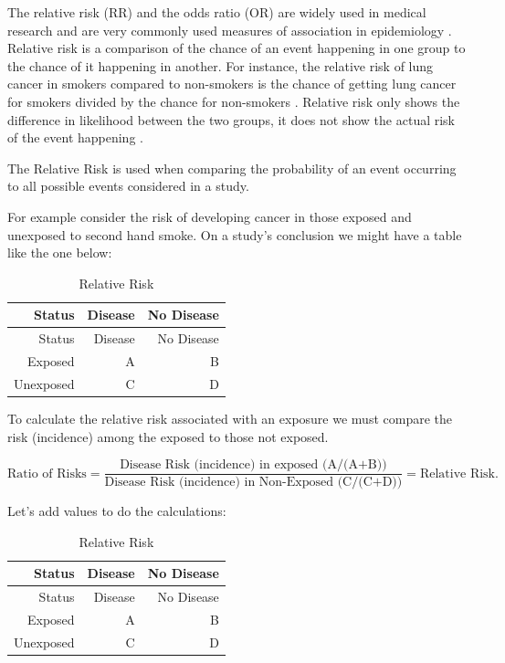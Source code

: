 \documentclass[
]{book}
\begin{document}
The relative risk (RR) and the odds ratio (OR) are widely used in medical research and are very commonly used measures of association in epidemiology \citep{schmidtty}. Relative risk is a comparison of the chance of an event happening in one group to the chance of it happening in another. For instance, the relative risk of lung cancer in smokers compared to non-smokers is the chance of getting lung cancer for smokers divided by the chance for non-smokers \citep{tenny}. Relative risk only shows the difference in likelihood between the two groups, it does not show the actual risk of the event happening \citep{tenny}.

The Relative Risk is used when comparing the probability of an event occurring to all possible events considered in a study.

For example consider the risk of developing cancer in those exposed and unexposed to second hand smoke. On a study's conclusion we might have a table like the one below:

\begin{longtable}[]{@{}rrr@{}}
\caption{\label{tab:table14} Relative Risk}\tabularnewline
\toprule
Status & Disease & No Disease \\
\midrule
\endfirsthead
\toprule
Status & Disease & No Disease \\
\midrule
\endhead
Exposed & A & B \\
Unexposed & C & D \\
\bottomrule
\end{longtable}

To calculate the relative risk associated with an exposure we must compare the risk (incidence) among the exposed to those not exposed.

\[\textrm{Ratio of Risks} = \frac{\textrm{Disease Risk (incidence) in exposed (A/(A+B))}}{ \textrm{Disease Risk (incidence) in Non-Exposed (C/(C+D))}} = \textrm{Relative Risk}. \]

Let's add values to do the calculations:

\begin{longtable}[]{@{}rrr@{}}
\caption{\label{tab:table15} Relative Risk}\tabularnewline
\toprule
Status & Disease & No Disease \\
\midrule
\endfirsthead
\toprule
Status & Disease & No Disease \\
\midrule
\endhead
Exposed & A & B \\
Unexposed & C & D \\
\bottomrule
\end{longtable}
\end{document}
